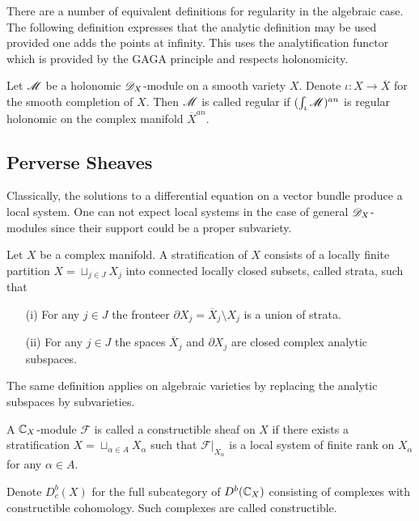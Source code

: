 There are a number of equivalent definitions for regularity in the algebraic case.
The following definition expresses that the analytic definition may be used provided one adds the points at infinity.
This uses the analytification functor which is provided by the GAGA principle and respects holonomicity.
\begin{definition}
  Let $\mathscr{M}$ be a holonomic $\mathscr{D}_X$-module on a smooth variety $X$. Denote $\iota:X \to \overline{X}$ for the smooth completion of $X$. Then $\mathscr{M}$ is called regular if $(\int_\iota \mathscr{M})^{an}$ is regular holonomic on the complex manifold $\overline{X}^{an}$.
\end{definition}
\subsection{Perverse Sheaves}
  Classically, the solutions to a differential equation on a vector bundle produce a local system.
  One can not expect local systems in the case of general $\mathscr{D}_X$-modules since their support could be a proper subvariety.
  \begin{definition}
    Let $X$ be a complex manifold. A stratification of $X$ consists of a locally finite partition $X  = \sqcup_{j\in J} X_j$ into connected locally closed subsets, called strata, such that
    \begin{enumerate}
      \item[(i)] For any $j\in J$ the fronteer $\partial X_j = \overline{X}_j\setminus X_j$ is a union of strata.
      \item[(ii)] For any $j\in J$ the spaces $\overline{X}_j$ and $\partial X_j$ are closed complex analytic subspaces.
    \end{enumerate}
  \end{definition}
  The same definition applies on algebraic varieties by replacing the analytic subspaces by subvarieties.
  \begin{definition}
     A $\mathbb{C}_X$-module $\mathcal{F}$ is called a constructible sheaf on $X$ if there exists a stratification $X = \sqcup_{\alpha\in A}X_\alpha$ such that $\mathcal{F}\vert_{X_\alpha}$ is a local system of finite rank on $X_\alpha$ for any $\alpha \in A$.
  \end{definition}
  Denote $D^b_c(X)$ for the full subcategory of $D^b(\mathbb{C}_X)$ consisting of complexes with constructible cohomology.
  Such complexes are called constructible.


